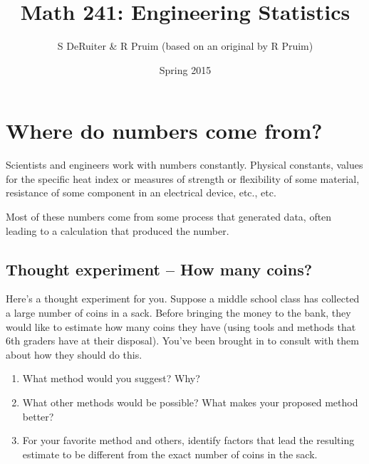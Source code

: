 \documentclass[twoside]{book}\usepackage[]{graphicx}\usepackage[]{xcolor}
\title{Math 241: Engineering Statistics}
\author{S DeRuiter \& R Pruim (based on an original by R Pruim)}
\date{Spring 2015}
\def\Chapter#1{%
\chapter{#1}
}
\begin{document}

\maketitle

\let\savecleardoublepage\cleardoublepage
\let\cleardoublepage\clearpage 

\setcounter{tocdepth}{1}
\tableofcontents

\let\cleardoublepage\savecleardoublepage






\setcounter{chapter}{-1}
\Chapter{Where do numbers come from?}

Scientists and engineers work with numbers constantly.  Physical constants, values for 
the specific heat index or measures of strength or flexibility of some material, 
resistance of some component in an electrical device, etc., etc.

Most of these numbers come from some process that generated data, often leading to a calculation
that produced the number.  
% 

\section*{Thought experiment -- How many coins?}
Here's a thought experiment for you.  Suppose a middle school class has collected a 
large number of coins in a sack.  Before bringing the money to the bank, they would like
to estimate how many coins they have (using tools and methods that 6th graders have at
their disposal).  You've been brought in to consult with them about how they should do this.
\begin{enumerate}
	\item
What method would you suggest?  Why?
\item
What other methods would be possible?  What makes your proposed method better?
\item
For your favorite method and others, identify factors that lead the resulting estimate
to be different from the exact number of coins in the sack.  
\end{enumerate}
\end{document}
